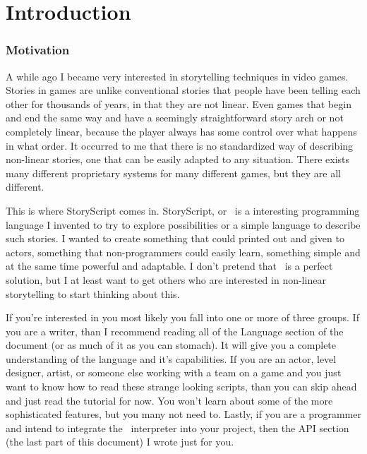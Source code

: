 

\part{Introduction}

\section{Motivation}

A while ago I became very interested in storytelling techniques in video games.  Stories in games are unlike conventional stories that people have been telling each other for thousands of years, in that they are not linear.  Even games that begin and end the same way and have a seemingly straightforward story arch or not completely linear, because the player always has some control over what happens in what order.  It occurred to me that there is no standardized way of describing non-linear stories, one that can be easily adapted to any situation.  There exists many different proprietary systems for many different games, but they are all different.

This is where StoryScript comes in.  StoryScript, or \SSquared\ is a interesting programming language I invented to try to explore possibilities or a simple language to describe such stories.  I wanted to create something that could printed out and given to actors, something that non-programmers could easily learn, something simple and at the same time powerful and adaptable.  I don't pretend that \SSquared\ is a perfect solution, but I at least want to get others who are interested in non-linear storytelling to start thinking about this.

If you're interested in \SSquared you most likely you fall into one or more of three groups.  If you are a writer, than I recommend reading all of the Language section of the document (or as much of it as you can stomach). It will give you a complete understanding of the language and it's capabilities.  If you are an actor, level designer, artist, or someone else working with a team on a game and you just want to know how to read these strange looking scripts, than you can skip ahead and just read the tutorial for now.  You won't learn about some of the more sophisticated features, but you many not need to.  Lastly, if you are a programmer and intend to integrate the \SSquared\ interpreter into your project, then the API section (the last part of this document) I wrote just for you.

